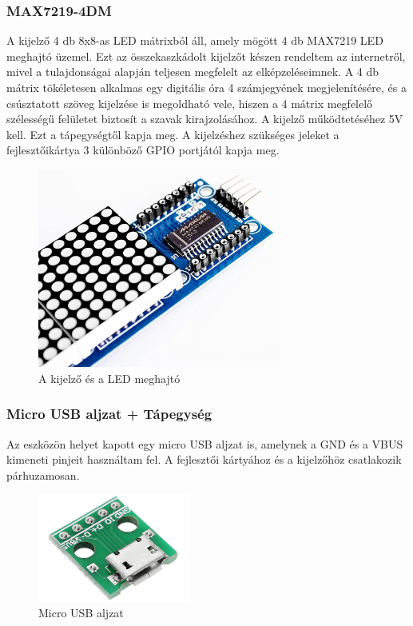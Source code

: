 \documentclass[a4paper, 12pt]{article}
\begin{document}
\subsubsection{MAX7219-4DM}
A kijelző 4 db 8x8-as LED mátrixból áll, amely mögött 4 db MAX7219 LED meghajtó üzemel. Ezt az összekaszkádolt kijelzőt készen rendeltem az internetről, mivel a tulajdonságai alapján teljesen megfelelt az elképzeléseimnek. A 4 db mátrix tökéletesen alkalmas egy digitális óra 4 számjegyének megjelenítésére, és a csúsztatott szöveg kijelzése is megoldható vele, hiszen a 4 mátrix megfelelő szélességű felületet biztosít a szavak kirajzolásához.
A kijelző működtetéséhez 5V kell. Ezt a tápegységtől kapja meg. A kijelzéshez szükséges jeleket a fejlesztőikártya 3 különböző GPIO portjától kapja meg.

\begin{figure}[ht]
	\centering
	\includegraphics[width = 8cm]{images/matrix.jpg}
	\caption{A kijelző és a LED meghajtó}
	\label{fig:matrix}
\end{figure}	

\subsubsection{Micro USB aljzat + Tápegység}

Az eszközön helyet kapott egy micro USB aljzat is, amelynek a GND és a VBUS kimeneti pinjeit használtam fel. A fejlesztői kártyához és a kijelzőhöz csatlakozik párhuzamosan.

\begin{figure}[ht]
	\centering
	\includegraphics[width = 5cm]{images/dip5.jpg}
	\caption{Micro USB aljzat}
	\label{fig:dip5}
\end{figure}
\end{document}
